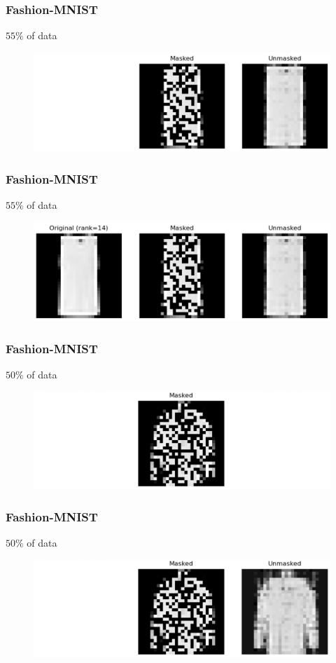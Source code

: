 \documentclass[
	11pt, %
]{beamer}
\begin{document}
\begin{frame}
	\frametitle{Fashion-MNIST}
	$55 \%$ of data
	\begin{figure}
		\centering
		\includegraphics[scale=.3]{assets/mc_ex1_unmasked.jpeg}
	\end{figure}
\end{frame}

\begin{frame}
	\frametitle{Fashion-MNIST}
	$55 \%$ of data
	\begin{figure}
		\centering
		\includegraphics[scale=.3]{assets/mc_ex1_orig.jpg}
	\end{figure}
\end{frame}

\begin{frame}
	\frametitle{Fashion-MNIST}
	$50 \%$ of data
	\begin{figure}
		\centering
		\includegraphics[scale=.2]{assets/mc_ex2_masked.jpeg}
	\end{figure}
\end{frame}

\begin{frame}
	\frametitle{Fashion-MNIST}
	$50 \%$ of data
	\begin{figure}
		\centering
		\includegraphics[scale=.2]{assets/mc_ex2_unmasked.jpeg}
	\end{figure}
\end{frame}
\end{document}
